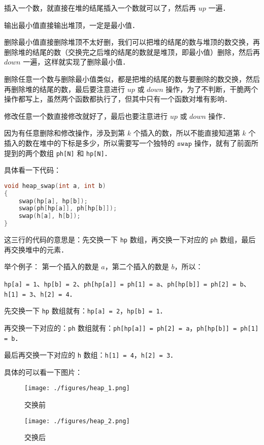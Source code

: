 插入一个数，就直接在堆的结尾插入一个数就可以了，然后再 $up$ 一遍．

输出最小值直接输出堆顶，一定是最小值．

删除最小值直接删除堆顶不太好删，我们可以把堆的结尾的数与堆顶的数交换，再删除堆的结尾的数（交换完之后堆的结尾的数就是堆顶，即最小值）删除，然后再 $down$ 一遍，这样就实现了删除最小值．

删除任意一个数与删除最小值类似，都是把堆的结尾的数与要删除的数交换，然后再删除堆的结尾的数，最后要注意进行 $up$ 或 $down$ 操作，为了不判断，干脆两个操作都写上，虽然两个函数都执行了，但其中只有一个函数对堆有影响．

修改任意一个数直接修改就好了，最后也要注意进行 $up$ 或 $down$ 操作．

因为有任意删除和修改操作，涉及到第 $k$ 个插入的数，所以不能直接知道第 $k$ 个插入的数在堆中的下标是多少，所以需要写一个独特的 $\mathtt{swap}$ 操作，就有了前面所提到的两个数组 \verb|ph[N]| 和 \verb|hp[N]|．

具体看一下代码：

\begin{lstlisting}[language=cpp]
void heap_swap(int a, int b)
{
    swap(hp[a], hp[b]);
    swap(ph[hp[a]], ph[hp[b]]);
    swap(h[a], h[b]);
}
\end{lstlisting}

这三行的代码的意思是：先交换一下 \verb|hp| 数组，再交换一下对应的 \verb|ph| 数组，最后再交换堆中的元素．

举个例子：
第一个插入的数是 $a$，第二个插入的数是 $b$，所以：

\verb|hp[a] = 1|、\verb|hp[b] = 2|、\verb|ph[hp[a]] = ph[1] = a|、\verb|ph[hp[b]] = ph[2] = b|、\verb|h[1] = 3|、\verb|h[2] = 4|．

先交换一下 \verb|hp| 数组就有：\verb|hp[a] = 2|，\verb|hp[b] = 1|．

再交换一下对应的：\verb|ph| 数组就有：\verb|ph[hp[a]] = ph[2] = a|，\verb|ph[hp[b]] = ph[1] = b|．

最后再交换一下对应的 \verb|h| 数组：\verb|h[1] = 4|，\verb|h[2] = 3|．

具体的可以看一下图片：
\begin{figure}[ht]
\centering
\texttt{[image: ./figures/heap\_1.png]}
\caption{交换前} \label{heap_fig1}
\end{figure}

\begin{figure}[ht]
\centering
\texttt{[image: ./figures/heap\_2.png]}
\caption{交换后} \label{heap_fig2}
\end{figure}

